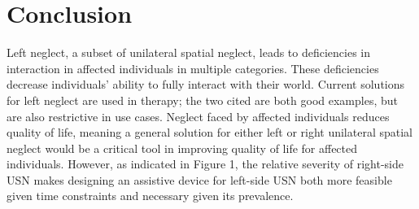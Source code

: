 \section{Conclusion}
Left neglect, a subset of unilateral spatial neglect, leads to deficiencies in
interaction in affected individuals in multiple categories. These deficiencies
decrease individuals’ ability to fully interact with their world. Current
solutions for left neglect are used in therapy; the two cited are both good
examples, but are also restrictive in use cases. Neglect faced by affected
individuals reduces quality of life, meaning a general solution for either left
or right unilateral spatial neglect would be a critical tool in improving
quality of life for affected individuals. However, as indicated in Figure 1,
the relative severity of right-side USN makes designing an assistive device for
left-side USN both more feasible given time constraints and necessary given its
prevalence.

